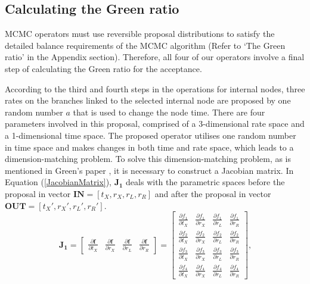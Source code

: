 \documentclass{bmcart}
\begin{document}
\subsection*{Calculating the Green ratio}
MCMC operators must use reversible proposal distributions to satisfy the detailed balance requirements of the MCMC algorithm (Refer to `The Green ratio' in the Appendix section). Therefore, all four of our operators involve a final step of calculating the Green ratio for the acceptance.

According to the third and fourth steps in the operations for internal nodes, three rates on the branches linked to the selected internal node are proposed by one random number $a$ that is used to change the node time. There are four parameters involved in this proposal, comprised of a 3-dimensional rate space and a 1-dimensional time space. The proposed operator utilises one random number in time space and makes changes in both time and rate space, which leads to a dimension-matching problem. To solve this dimension-matching problem, as is mentioned in Green's paper \cite{green1995reversible}, it is necessary to construct a Jacobian matrix.  In Equation (\ref{JacobianMatrix}), ${\mathbf{J_1}}$ deals with the parametric spaces before the proposal in vector ${\mathbf{IN}} = [{t_X},{r_X},{r_L},{r_R}]$ and after the proposal in vector ${\mathbf{OUT}} = [{t_X}',{r_X}',{r_L}',{r_R}']$.
\begin{equation}\label{JacobianMatrix}
{\mathbf{J_1}} = \left[ {\begin{array}{*{20}{c}}
  {\frac{{\partial {\mathbf{f}}}}{{\partial {t_X}}}}&{\frac{{\partial {\mathbf{f}}}}{{\partial {r_X}}}}&{\frac{{\partial {\mathbf{f}}}}{{\partial {r_L}}}}&{\frac{{\partial {\mathbf{f}}}}{{\partial {r_R}}}}
\end{array}} \right] = \left[ {\begin{array}{*{20}{c}}
  {\frac{{\partial {f_1}}}{{\partial {t_X}}}}&{\frac{{\partial {f_1}}}{{\partial {r_X}}}}&{\frac{{\partial {f_1}}}{{\partial {r_L}}}}&{\frac{{\partial {f_1}}}{{\partial {r_R}}}} \\
  {\frac{{\partial {f_2}}}{{\partial {t_X}}}}&{\frac{{\partial {f_2}}}{{\partial {r_X}}}}&{\frac{{\partial {f_2}}}{{\partial {r_L}}}}&{\frac{{\partial {f_2}}}{{\partial {r_R}}}} \\
  {\frac{{\partial {f_3}}}{{\partial {t_X}}}}&{\frac{{\partial {f_3}}}{{\partial {r_X}}}}&{\frac{{\partial {f_3}}}{{\partial {r_L}}}}&{\frac{{\partial {f_3}}}{{\partial {r_R}}}} \\
  {\frac{{\partial {f_4}}}{{\partial {t_X}}}}&{\frac{{\partial {f_4}}}{{\partial {r_X}}}}&{\frac{{\partial {f_4}}}{{\partial {r_L}}}}&{\frac{{\partial {f_4}}}{{\partial {r_R}}}}
\end{array}} \right]\text{,}
\end{equation}
\end{document}
